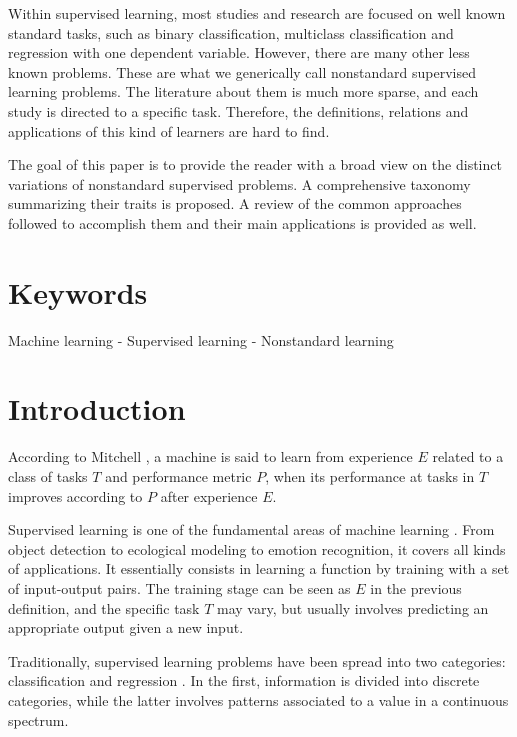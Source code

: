 Within supervised learning, most studies and research are focused on well known standard tasks, such as binary classification, multiclass classification and regression with one dependent variable. However, there are many other less known problems. These are what we generically call nonstandard supervised learning problems. The literature about them is much more sparse, and each study is directed to a specific task. Therefore, the definitions, relations and applications of this kind of learners are hard to find.

The goal of this paper is to provide the reader with a broad view on the distinct variations of nonstandard supervised problems. A comprehensive taxonomy summarizing their traits is proposed. A review of the common approaches followed to accomplish them and their main applications is provided as well.

\section*{Keywords}
Machine learning - Supervised learning - Nonstandard learning

\section{Introduction}
\label{p3intro}

According to Mitchell \cite{learning-mitchell}, a machine is said to learn from experience $E$ related to a class of tasks $T$ and performance metric $P$, when its performance at tasks in $T$  improves according to $P$ after experience $E$.

Supervised learning is one of the fundamental areas of machine learning \cite{learning-marsland}. From object detection to ecological modeling to emotion recognition, it covers all kinds of applications. It essentially consists in learning a function by training with a set of input-output pairs. The training stage can be seen as $E$ in the previous definition, and the specific task $T$ may vary, but usually involves predicting an appropriate output given a new input.

Traditionally, supervised learning problems have been spread into two categories: classification and regression \cite{classification,pattern-rec}. In the first, information is divided into discrete categories, while the latter involves patterns associated to a value in a continuous spectrum.

